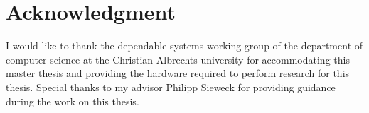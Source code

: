 \chapter*{Acknowledgment}

I would like to thank the dependable systems working group of the department of computer science at the Christian-Albrechts university for accommodating this master thesis and providing the hardware required to perform research for this thesis.
Special thanks to my advisor Philipp Sieweck for providing guidance during the work on this thesis.